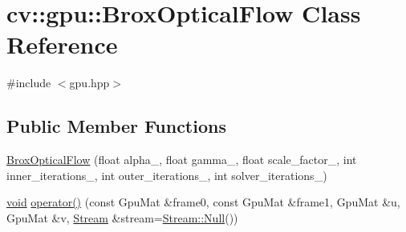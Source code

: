 \hypertarget{classcv_1_1gpu_1_1BroxOpticalFlow}{\section{cv\-:\-:gpu\-:\-:Brox\-Optical\-Flow Class Reference}
\label{classcv_1_1gpu_1_1BroxOpticalFlow}
}


{\ttfamily \#include $<$gpu.\-hpp$>$}

\subsection*{Public Member Functions}
\begin{DoxyCompactItemize}
\item 
\hyperlink{classcv_1_1gpu_1_1BroxOpticalFlow_a21c7bb316c354657ed6272c791c2754f}{Brox\-Optical\-Flow} (float alpha\-\_\-, float gamma\-\_\-, float scale\-\_\-factor\-\_\-, int inner\-\_\-iterations\-\_\-, int outer\-\_\-iterations\-\_\-, int solver\-\_\-iterations\-\_\-)
\item 
\hyperlink{legacy_8hpp_a8bb47f092d473522721002c86c13b94e}{void} \hyperlink{classcv_1_1gpu_1_1BroxOpticalFlow_a517ca89c79866cfb39f7606b7ac7ab4f}{operator()} (const Gpu\-Mat \&frame0, const Gpu\-Mat \&frame1, Gpu\-Mat \&u, Gpu\-Mat \&v, \hyperlink{classcv_1_1gpu_1_1Stream}{Stream} \&stream=\hyperlink{classcv_1_1gpu_1_1Stream_af96c23564834f88333dcb8997df553f1}{Stream\-::\-Null}())
\end{DoxyCompactItemize}
